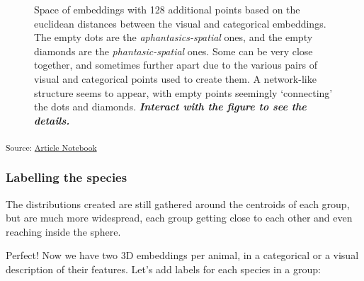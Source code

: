 \documentclass[
  authoryear]{elsarticle}
\begin{document}
\label{cell-fig-intermediate-embeddings}
\begin{figure}[H]


\caption{\label{fig-intermediate-embeddings}Space of embeddings with 128
additional points based on the euclidean distances between the visual
and categorical embeddings. The empty dots are the
\emph{aphantasics-spatial} ones, and the empty diamonds are the
\emph{phantasic-spatial} ones. Some can be very close together, and
sometimes further apart due to the various pairs of visual and
categorical points used to create them. A network-like structure seems
to appear, with empty points seemingly `connecting' the dots and
diamonds. \textbf{\emph{Interact with the figure to see the details.}}}

\end{figure}%

\textsubscript{Source:
\href{https://m-delem.github.io/2499-similarity-manuscript/index.qmd.html}{Article
Notebook}}

\subsubsection{Labelling the species}\label{labelling-the-species}

The distributions created are still gathered around the centroids of
each group, but are much more widespread, each group getting close to
each other and even reaching inside the sphere.

Perfect! Now we have two 3D embeddings per animal, in a categorical or a
visual description of their features. Let's add labels for each species
in a group:
\end{document}
